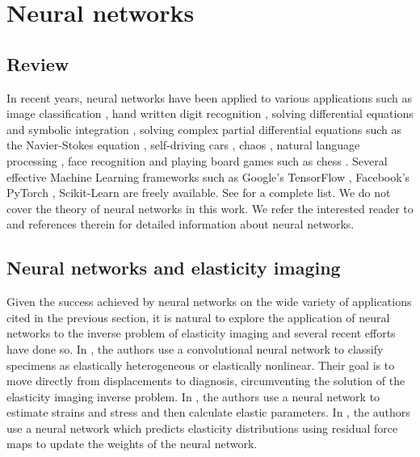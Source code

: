\documentclass[12pt]{article}
\begin{document}
\section{Neural networks}
\subsection{Review}
In recent years, neural networks have been applied to various applications such as image classification \cite{paper:hinton2017}, hand written digit recognition \cite{paper:kulkarni2018}, solving differential equations and symbolic integration \cite{misc:lample2019}, solving complex partial differential equations such as the Navier-Stokes equation \cite{misc:anandkumar2020}, self-driving cars \cite{misc:agnihotri2019,misc:nvidiaselfdriving2016}, chaos \cite{paper:pathak2018}, natural language processing \cite{misc:googlenlp}, face recognition \cite{conf:taigman2014} and playing board games such as chess \cite{paper:alphazero}. Several effective Machine Learning frameworks such as Google's TensorFlow \cite{misc:tensorflow}, Facebook's PyTorch \cite{incollect:pytorch}, Scikit-Learn \cite{paper:scikit-learn} are freely available. See \cite{misc:compdeep} for a complete list. We do not cover the theory of neural networks in this work. We refer the interested reader to \cite{book:aggarwal,book:geron2019,book:goodfellow,book:chollet,misc:cs231n,misc:andrewng,misc:udemy} and references therein for detailed information about neural networks.
\subsection{Neural networks and elasticity imaging}
Given the success achieved by neural networks on the wide variety of applications cited in the previous section, it is natural to explore the application of neural networks to the inverse problem of elasticity imaging and several recent efforts \cite{paper:pateloberai2019,misc:gu2020,paper:hoeriginsana2016} have done so. In \cite{paper:pateloberai2019}, the authors use a convolutional neural network to classify specimens as elastically heterogeneous or elastically nonlinear. Their goal is to move directly from displacements to diagnosis, circumventing the solution of the elasticity imaging inverse problem. In \cite{paper:hoeriginsana2016}, the authors use a neural network to estimate strains and stress and then calculate elastic parameters. In \cite{misc:gu2020}, the authors use a neural network which predicts elasticity distributions using residual force maps to update the weights of the neural network.
\end{document}
